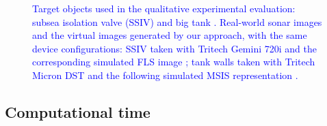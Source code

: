 \documentclass[final,5p,times]{elsarticle}
\begin{document}
\begin{figure}[!ht]
{        \label{fig:eval:tank:real}
    }
    \setcounter{subfigure}{2}
    \setcounter{subfigure}{5}
    \captionsetup{justification=justified}
    \caption{\textcolor{blue}{Target objects used in the qualitative experimental evaluation: subsea isolation valve (SSIV)  and big tank . Real-world sonar images and the virtual images generated by our approach, with the same device configurations: SSIV taken with Tritech Gemini 720i  and the corresponding simulated FLS image ; tank walls taken with Tritech Micron DST  and the following simulated MSIS representation .}}
    \label{fig:eval}
\end{figure}

\subsection{Computational time}
\end{document}
